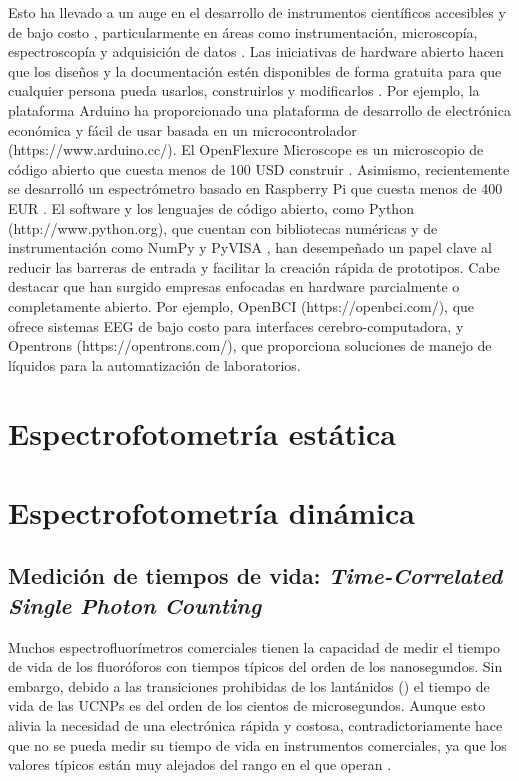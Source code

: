 Esto ha llevado a un auge en el desarrollo de instrumentos científicos accesibles y de bajo costo \cite{wenzel_open_2023, arancio_inequalities_2023}, particularmente en áreas como instrumentación, microscopía, espectroscopía y adquisición de datos \cite{jameson_fluorescent_1989, li_optical_2022, hu_fluorescent_2022}.
Las iniciativas de hardware abierto hacen que los diseños y la documentación estén disponibles de forma gratuita para que cualquier persona pueda usarlos, construirlos y modificarlos \cite{powell_democratizing_2012, oellermann_open_2022}.
Por ejemplo, la plataforma Arduino ha proporcionado una plataforma de desarrollo de electrónica económica y fácil de usar basada en un microcontrolador (https://www.arduino.cc/).
El OpenFlexure Microscope es un microscopio de código abierto que cuesta menos de 100 USD construir \cite{collins_robotic_2020}.
Asimismo, recientemente se desarrolló un espectrómetro basado en Raspberry Pi que cuesta menos de 400 EUR \cite{tunens_optical_2024}.
El software y los lenguajes de código abierto, como Python (http://www.python.org), que cuentan con bibliotecas numéricas y de instrumentación como NumPy \cite{harris_array_2020} y PyVISA \cite{grecco_pyvisa_2023}, han desempeñado un papel clave al reducir las barreras de entrada y facilitar la creación rápida de prototipos.
Cabe destacar que han surgido empresas enfocadas en hardware parcialmente o completamente abierto. Por ejemplo, OpenBCI (https://openbci.com/), que ofrece sistemas EEG de bajo costo para interfaces cerebro-computadora, y Opentrons (https://opentrons.com/), que proporciona soluciones de manejo de líquidos para la automatización de laboratorios.


\section{Espectrofotometría estática}
\section{Espectrofotometría dinámica} 

\subsection{Medición de tiempos de vida: \textit{Time-Correlated Single Photon Counting}} \label{sec:intro_tcspc}

Muchos espectrofluorímetros comerciales tienen la capacidad de medir el tiempo de vida de los fluoróforos con tiempos típicos del orden de los nanosegundos. 
Sin embargo, debido a las transiciones prohibidas de los lantánidos () el tiempo de vida de las UCNPs es del orden de los cientos de microsegundos.
Aunque esto alivia la necesidad de una electrónica rápida y costosa, contradictoriamente hace que no se pueda medir su tiempo de vida en instrumentos comerciales, ya que los valores típicos están muy alejados del rango en el que operan \cite{bujjamer2020}.

